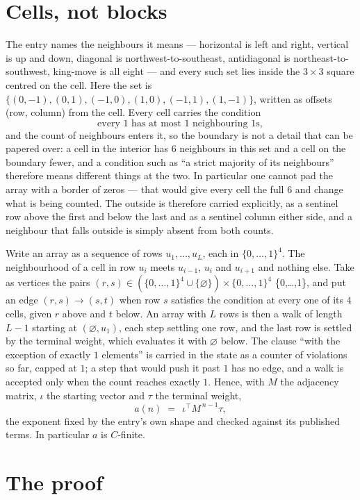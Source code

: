 \documentclass[11pt,a4paper]{article}
\theoremstyle{plain}
\theoremstyle{definition}
\begin{document}
\section{Cells, not blocks}

The entry names the neighbours it means --- horizontal is left and right, vertical is up and
down, diagonal is northwest-to-southeast, antidiagonal is northeast-to-southwest, king-move is
all eight --- and every such set lies inside the $3\times3$ square centred on the cell. Here
the set is $\{(0,-1), (0,1), (-1,0), (1,0), (-1,1), (1,-1)\}$, written as offsets (row, column) from the cell. Every cell carries
the condition
\[
\text{every 1 has at most 1 neighbouring 1s},
\]
and the count of neighbours enters it, so the boundary is not a detail that can be papered
over: a cell in the interior has $6$ neighbours in this set and a cell on the boundary
fewer, and a condition such as ``a strict majority of its neighbours'' therefore means
different things at the two. In particular one cannot pad the array with a border of zeros ---
that would give every cell the full $6$ and change what is being counted. The outside is
therefore carried
explicitly, as a sentinel row above the first and below the last and as a sentinel column
either side, and a neighbour that falls outside is simply absent from both counts.

Write an array as a sequence of rows $u_1,\dots,u_L$, each in
$\{0,\dots,1\}^{4}$. The neighbourhood of a cell in row $u_i$ meets $u_{i-1}$,
$u_i$ and $u_{i+1}$ and nothing else. Take as vertices the pairs
$(r,s)\in(\{0,\dots,1\}^{4}\cup\{\varnothing\})\times\{0,\dots,1\}^{4}$ \times \{0,\dots,1\},
and put an edge $(r,s)\to(s,t)$ when row $s$ satisfies the condition at every one of its
$4$ cells, given $r$ above and $t$ below. An array with $L$ rows is then a walk of length
$L-1$ starting at $(\varnothing,u_1)$, each step settling one row, and the last row is
settled by the terminal weight, which evaluates it with $\varnothing$ below. The clause ``with the exception of exactly $1$ elements'' is carried in
the state as a counter of violations so far, capped at $1$; a step that would push it past
$1$ has no edge, and a walk is accepted only when the count reaches exactly $1$. Hence,
with $M$ the adjacency matrix, $\iota$ the starting vector and $\tau$ the terminal weight,
\[
a(n)\;=\;\,\iota^{\!\top}M^{\,n-1}\tau ,
\]
the exponent fixed by the entry's own shape and checked against its published terms. In
particular $a$ is $C$-finite.

\section{The proof}
\end{document}

